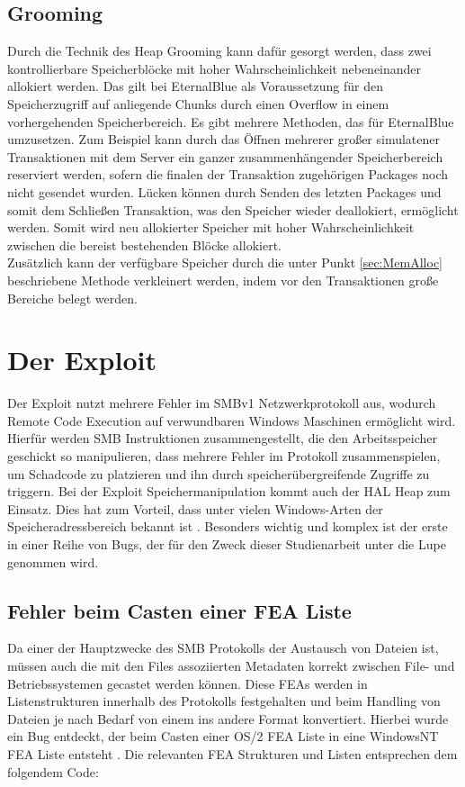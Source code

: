 \documentclass[DIV=12,headings=normal,pdftex,headinclude=false,footinclude=false,final]{scrreprt}
\begin{document}
\section{Grooming}\label{sec:Grooming}
Durch die Technik des Heap Grooming kann dafür gesorgt werden, dass zwei kontrollierbare Speicherblöcke mit hoher Wahrscheinlichkeit nebeneinander allokiert werden. Das gilt bei EternalBlue als Voraussetzung für den Speicherzugriff auf anliegende Chunks durch einen Overflow in einem vorhergehenden Speicherbereich. Es gibt mehrere Methoden, das für EternalBlue umzusetzen. Zum Beispiel kann durch das Öffnen mehrerer großer simulatener Transaktionen mit dem Server ein ganzer zusammenhängender Speicherbereich reserviert werden, sofern die finalen der Transaktion zugehörigen Packages  noch nicht gesendet wurden\cite{}. Lücken können durch Senden des letzten Packages und somit dem Schließen Transaktion, was den Speicher wieder deallokiert, ermöglicht werden. Somit wird neu allokierter Speicher mit hoher Wahrscheinlichkeit zwischen die bereist bestehenden Blöcke allokiert.\\ Zusätzlich kann der verfügbare Speicher durch die unter Punkt \ref{sec:MemAlloc} beschriebene Methode verkleinert werden, indem vor den Transaktionen große Bereiche belegt werden.


\chapter{Der Exploit}
Der Exploit nutzt mehrere Fehler im SMBv1 Netzwerkprotokoll aus, wodurch Remote Code Execution auf verwundbaren Windows Maschinen ermöglicht wird.\\ Hierfür werden SMB Instruktionen zusammengestellt, die den Arbeitsspeicher geschickt so manipulieren, dass mehrere Fehler im Protokoll zusammenspielen, um Schadcode zu platzieren und ihn durch speicherübergreifende Zugriffe zu triggern\cite{Medium}. Bei der Exploit Speichermanipulation kommt auch der HAL Heap zum Einsatz. Dies hat zum Vorteil, dass unter vielen Windows-Arten der Speicheradressbereich bekannt ist \cite{GH:FEA}. Besonders wichtig und komplex ist der erste in einer Reihe von Bugs, der für den Zweck dieser Studienarbeit unter die Lupe genommen wird.

\section{Fehler beim Casten einer FEA Liste}\label{sec:FEA_Cast}
Da einer der Hauptzwecke des SMB Protokolls der Austausch von Dateien ist, müssen auch die mit den Files assoziierten Metadaten korrekt zwischen File- und Betriebssystemen gecastet werden können. Diese FEAs werden in Listenstrukturen innerhalb des Protokolls festgehalten und beim Handling von Dateien je nach Bedarf von einem ins andere Format konvertiert. Hierbei wurde ein Bug entdeckt, der beim Casten einer OS/2 FEA Liste in eine WindowsNT FEA Liste entsteht \cite{TM:EB}. Die relevanten FEA Strukturen und Listen entsprechen dem folgendem Code:\\
\end{document}
